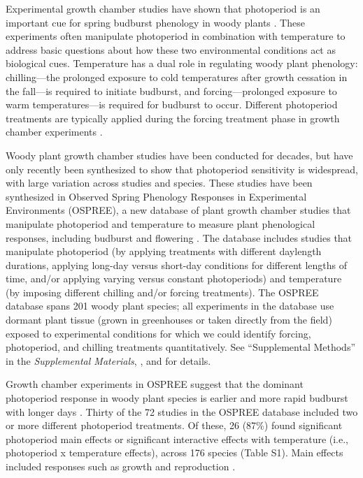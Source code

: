 \documentclass{article}
\begin{document}
\par Experimental growth chamber studies have shown that photoperiod is an important cue for spring budburst phenology in woody plants \citep[e.g.,][]{flynn2018,Basler:2014aa,Heide:1993a}. These experiments often manipulate photoperiod in combination with temperature to address basic questions about how these two environmental conditions act as biological cues. Temperature has a dual role in regulating woody plant phenology: chilling---the prolonged exposure to cold temperatures after growth cessation in the fall---is required to initiate budburst, and forcing---prolonged exposure to warm temperatures---is required for budburst to occur. Different photoperiod treatments are typically applied during the forcing treatment phase in growth chamber experiments \citep[e.g.,][]{Laube:2014a,Spann:2004aa,Falusi:1990aa,HEIDE:1977aa,Campbell:1975aa}. 

\par Woody plant growth chamber studies have been conducted for decades, but have only recently been synthesized to show that photoperiod sensitivity is widespread, with large variation across studies and species. These studies have been synthesized in Observed Spring Phenology Responses in Experimental Environments (OSPREE), a new database of plant growth chamber studies that manipulate photoperiod and temperature to measure plant phenological responses, including budburst and flowering \citep{wolkovich2019}. The database includes studies that manipulate photoperiod (by applying treatments with different daylength durations, applying long-day versus short-day conditions for different lengths of time, and/or applying varying versus constant photoperiods) and temperature (by imposing different chilling and/or forcing treatments). The OSPREE database spans 201 woody plant species; all experiments in the database use dormant plant tissue (grown in greenhouses or taken directly from the field) exposed to experimental conditions for which we could identify forcing, photoperiod, and chilling treatments quantitatively. See ``Supplemental Methods'' in the \emph{Supplemental Materials}, \citet{ettinger2020}, and \citet{wolkovich2019} for details. 


\par Growth chamber experiments in OSPREE suggest that the dominant photoperiod response in woody plant species is earlier and more rapid budburst with longer days \citep [e.g., ][]{Caffarra:2011a}. Thirty of the 72 studies in the OSPREE database included two or more different photoperiod treatments. Of these, 26 (87\%) found significant photoperiod main effects or significant interactive effects with temperature (i.e., photoperiod x temperature effects), across 176 species (Table S1). Main effects included responses such as growth \citep[e.g., higher growth rates with longer days][]{Ashby:1962aa} and reproduction \citep[e.g., increased flowering with longer days][]{Heide:2012aa}. 
\end{document}
